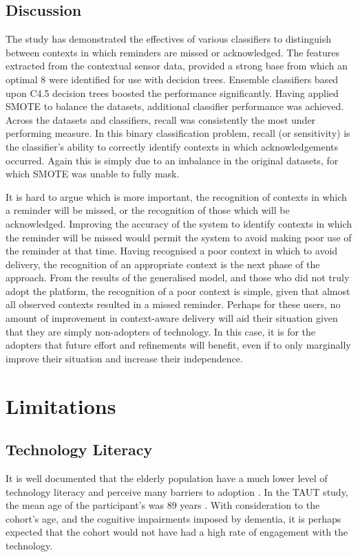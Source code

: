 \subsection{Discussion}
The study has demonstrated the effectives of various classifiers to distinguish between contexts in which reminders are missed or acknowledged. The features extracted from the contextual sensor data, provided a strong base from which an optimal 8 were identified for use with decision trees. Ensemble classifiers based upon C4.5 decision trees boosted the performance significantly.  Having applied SMOTE to balance the datasets, additional classifier performance was achieved. Across the datasets and classifiers, recall was consistently the most under performing measure. In this binary classification problem, recall (or sensitivity) is the classifier's ability to correctly identify contexts in which acknowledgements occurred. Again this is simply due to an imbalance in the original datasets, for which SMOTE was unable to fully mask.

It is hard to argue which is more important, the recognition of contexts in which a reminder will be missed, or the recognition of those which will be acknowledged. Improving the accuracy of the system to identify contexts in which the reminder will be missed would permit the system to avoid making poor use of the reminder at that time. Having recognised a poor context in which to avoid delivery, the recognition of an appropriate context is the next phase of the approach.
From the results of the generalised model, and those who did not truly adopt the platform, the recognition of a poor context is simple, given that almost all observed contexts resulted in a missed reminder.
Perhaps for these users, no amount of improvement in context-aware delivery will aid their situation given that they are simply non-adopters of technology. In this case, it is for the adopters that future effort and refinements will benefit, even if to only marginally improve their situation and increase their independence.

\section{Limitations}

\subsection{Technology Literacy}
It is well documented that the elderly population have a much lower level of technology literacy and perceive many barriers to adoption \cite{Cleland2014-IWAAL, Gilly1985, Renaud2008}. In the TAUT study, the mean age of the participant's was 89 years \cite{Cleland2014-IWAAL}. With consideration to the cohort's age, and the cognitive impairments imposed by dementia, it is perhaps expected that the cohort would not have had a high rate of engagement with the technology.

